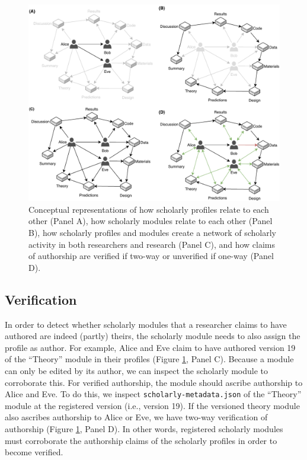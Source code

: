 \documentclass[publications,article,submit,moreauthors,pdftex,10pt,a4paper]{Definitions/mdpi}
\begin{document}
\begin{figure}

{\centering \includegraphics[width=1\linewidth]{fig4} 

}

\caption{Conceptual representations of how scholarly profiles relate to each other (Panel A), how scholarly modules relate to each other (Panel B), how scholarly profiles and modules create a network of scholarly activity in both researchers and research (Panel C), and how claims of authorship are verified if two-way or unverified if one-way (Panel D).}\label{fig:datcom-fig4}
\end{figure}

\subsection*{Verification}\label{verification}

In order to detect whether scholarly modules that a researcher claims to
have authored are indeed (partly) theirs, the scholarly module needs to
also assign the profile as author. For example, Alice and Eve claim to
have authored version 19 of the ``Theory'' module in their profiles
(Figure \ref{fig:datcom-fig4}, Panel C). Because a module can only be
edited by its author, we can inspect the scholarly module to corroborate
this. For verified authorship, the module should ascribe authorship to
Alice and Eve. To do this, we inspect \texttt{scholarly-metadata.json}
of the ``Theory'' module at the registered version (i.e., version 19).
If the versioned theory module also ascribes authorship to Alice or Eve,
we have two-way verification of authorship (Figure
\ref{fig:datcom-fig4}, Panel D). In other words, registered scholarly
modules must corroborate the authorship claims of the scholarly profiles
in order to become verified.
\end{document}

